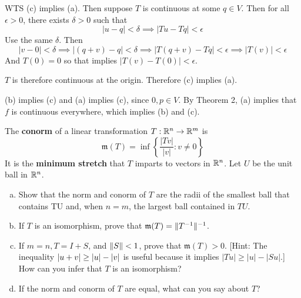 \documentclass[a4paper, 12pt]{article}
\begin{document}
\begin{solution}
    WTS (c) implies (a). Then suppose $T$ is continuous at some $q \in V$. Then for all $\epsilon > 0$, there exists $\delta > 0$ such that \[
        |u - q| < \delta \implies |Tu - Tq| < \epsilon
    \]
    Use the same $\delta$. Then \[
        |v - 0| < \delta \implies |(q+v) - q| < \delta \implies |T(q+ v) - Tq| < \epsilon \implies |T(v)| < \epsilon
    \]
    And $T(0) = 0$ so that implies $|T(v) - T(0)| < \epsilon$.

    $T$ is therefore continuous at the origin. Therefore (c) implies (a).

    (b) implies (c) and (a) implies (c), since $0, p \in V$. By Theorem 2, (a) implies that $f$ is continuous everywhere, which implies (b) and (c).
\end{solution}
\begin{problem} 
The \textbf{conorm} of a linear transformation $T: \mathbb{R}^n \to \mathbb{R}^m$ is \[
    \mathfrak{m}(T) = \inf \left\{\frac{|Tv|}{|v|} : v \neq 0\right\}
\]
It is the \textbf{minimum stretch} that $T$ imparts to vectors in $\mathbb{R}^n$. Let $U$ be the unit ball in $\mathbb{R}^n$.\begin{enumerate} [(a)]
    \item Show that the norm and conorm of $T$ are the radii of the smallest ball that contains TU and, when $n = m$, the largest ball contained in $TU$.
    \item If $T$ is an isomorphism, prove that $\mathfrak{m}(T) = \lVert T^{-1}\rVert^{-1}$.
    \item If $m = n, T = I + S$, and $\lVert S\rVert < 1$, prove that $\mathfrak{m}(T) > 0$. [Hint: The inequality $\lvert u + v\rvert \geq \lvert u\rvert - \lvert v\rvert$ is useful because it implies $|Tu| \geq |u| - |Su|$.] How can you infer that $T$ is an isomorphism?
    \item If the norm and conorm of $T$ are equal, what can you say about $T$?
\end{enumerate}
\end{problem}
\end{document}
